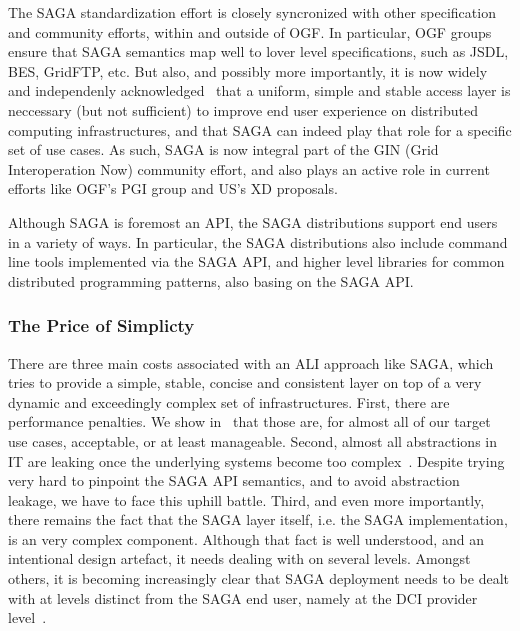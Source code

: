 \documentclass[10pt,conference,final,letterpaper,twoside,twocolumn,]{IEEEtran}
\begin{document}
 The SAGA standardization effort is closely syncronized with other
 specification and community efforts, within and outside of OGF.  In
 particular, OGF groups ensure that SAGA semantics map well to lover
 level specifications, such as JSDL, BES, GridFTP, etc.   But also,
 and possibly more importantly, it is now widely and independenly
 acknowledged~\cite{XD,EGI,UMD,Naregi} that a uniform, simple and
 stable access layer is neccessary (but not sufficient) to improve end
 user experience on distributed computing infrastructures, and that
 SAGA can indeed play that role for a specific set of use cases.  As
 such, SAGA is now integral part of the GIN (Grid Interoperation Now)
 community effort, and also plays an active role in current efforts
 like OGF's PGI group and US's XD proposals.
  
 Although SAGA is foremost an API, the SAGA distributions support end
 users in a variety of ways.  In particular, the SAGA distributions
 also include command line tools implemented via the SAGA API, and
 higher level libraries for common distributed programming patterns,
 also basing on the SAGA API.


 \subsubsection*{The Price of Simplicty\cite{sagaprice}}

  There are three main costs associated with an ALI approach like SAGA,
  which tries to provide a simple, stable, concise and consistent
  layer on top of a very dynamic and exceedingly complex set of
  infrastructures.  First, there are performance penalties.  We show
  in~\cite{sagaperf} that those are, for almost all of our target use
  cases, acceptable, or at least manageable.  Second, almost all
  abstractions in IT are leaking once the underlying systems become
  too complex~\cite{leaky_abstractions}.  Despite trying very hard to
  pinpoint the SAGA API semantics, and to avoid abstraction leakage,
  we have to face this uphill battle.  Third, and even more
  importantly, there remains the fact that the SAGA layer itself, i.e.
  the SAGA implementation, is an very complex component.  Although
  that fact is well understood, and an intentional design artefact, it
  needs dealing with on several levels.  Amongst others, it is
  becoming increasingly clear that SAGA deployment needs to be dealt
  with at levels distinct from the SAGA end user, namely at the DCI
  provider level~\cite{UMD,XD,TG}.
\end{document}
